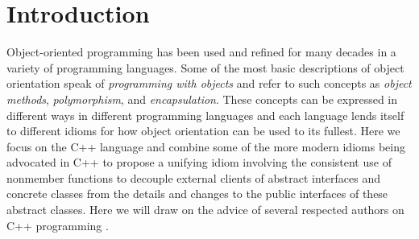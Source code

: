 \documentclass[pdf,ps2pdf,11pt]{SANDreport}
\begin{document}


%
\SANDmain %

%
\section{Introduction}
%

Object-oriented programming has been used and refined for many decades in a
variety of programming languages.  Some of the most basic descriptions of
object orientation speak of {}\textit{programming with objects} and refer to
such concepts as {}\textit{object methods}, {}\textit{polymorphism}, and
{}\textit{encapsulation}.  These concepts can be expressed in different ways
in different programming languages and each language lends itself to different
idioms for how object orientation can be used to its fullest.  Here we focus
on the C++ language and combine some of the more modern idioms being advocated
in C++ to propose a unifying idiom involving the consistent use of nonmember
functions to decouple external clients of abstract interfaces and concrete
classes from the details and changes to the public interfaces of these
abstract classes.  Here we will draw on the advice of several respected
authors on C++ programming {}\cite{C++CodingStandards05,EffectiveC++3rd}.
\end{document}
